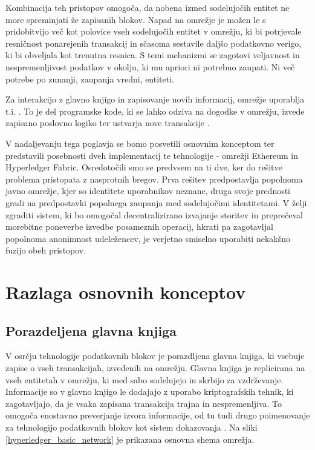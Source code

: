 \documentclass[a4paper, 12pt]{book}
\begin{document}
Kombinacija teh pristopov omogoča, da nobena izmed sodelujočih entitet ne more spreminjati že zapisanih blokov.
Napad na omrežje je možen le s pridobitvijo več kot polovice vseh sodelujočih entitet v omrežju, ki bi potrjevale resničnost ponarejenih transakcij in sčasoma sestavile daljšo podatkovno verigo, ki bi obveljala kot trenutna resnica.
S temi mehanizmi se zagotovi veljavnost in nespremenljivost podatkov v okolju, ki mu apriori ni potrebno zaupati.
Ni več potrebe po zunanji, zaupanja vredni, entiteti.

Za interakcijo z glavno knjigo in zapisovanje novih informacij, omrežje uporablja t.i. .
To je del programske kode, ki se lahko odziva na dogodke v omrežju, izvede zapisano poslovno logiko ter ustvarja nove transakcije \cite{hyperledgerDocs}.

V nadaljevanju tega poglavja se bomo posvetili osnovnim konceptom ter predstavili posebnosti dveh implementacij te tehnologije - omrežji Ethereum in Hyperledger Fabric.
Osredotočili smo se predvsem na ti dve, ker do rešitve problema pristopata z nasprotnih bregov.
Prva rešitev predpostavlja popolnoma javno omrežje, kjer so identitete uporabnikov neznane, druga svoje prednosti gradi na predpostavki popolnega zaupanja med sodelujočimi identitetami.
V želji zgraditi sistem, ki bo omogočal decentralizirano izvajanje storitev in preprečeval morebitne poneverbe izvedbe posameznih operacij, hkrati pa zagotavljal popolnoma anonimnost udeležencev, je verjetno smiselno uporabiti nekakšno fuzijo obeh pristopov.

\section{Razlaga osnovnih konceptov}

\subsection{Porazdeljena glavna knjiga}
V osrčju tehnologije podatkovnih blokov je porazdljena glavna knjiga, ki vsebuje zapise o vseh transakcijah, izvedenih na omrežju.
Glavna knjiga je replicirana na vseh entitetah v omrežju, ki med sabo sodelujejo in skrbijo za vzdrževanje.
Informacije so v glavno knjigo le dodajajo z uporabo kriptografskih tehnik, ki zagotavljajo, da je vsaka zapisana transakcija trajna in nespremenljiva.
To omogoča enostavno preverjanje izvora informacije, od tu tudi drugo poimenovanje za tehnologijo podatkovnih blokov kot sistem dokazovanja \cite{hyperledgerDocs}.
Na sliki \ref{hyperledger_basic_network} je prikazana osnovna shema omrežja.
\end{document}
